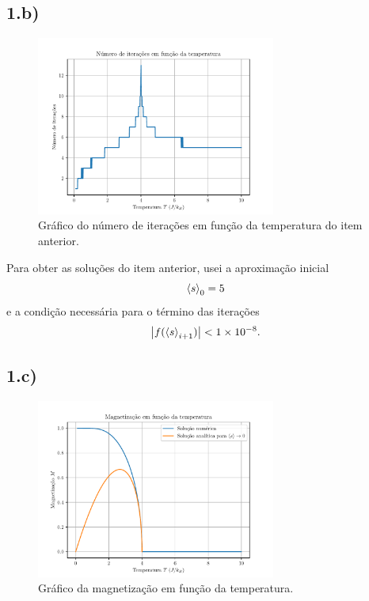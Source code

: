 \documentclass[a4paper, brazil]{article}
\begin{document}
\newpage
\subsection*{1.b)}

    \begin{figure}[ht]
        \centering
        \includegraphics[width=0.7\textwidth]{fig_1b.pdf}
        \caption{Gráfico do número de iterações em função da temperatura do item anterior.}\label{fig1b}
    \end{figure}

    Para obter as soluções do item anterior, usei a aproximação inicial
    \begin{equation}
        \expval{s}_0 = 5
    \end{equation}
    e a condição necessária para o término das iterações
    \begin{equation}
        \abs{f( \expval{s}_{i + 1} )} < \num{1e-8} .
    \end{equation}

\newpage
\subsection*{1.c)}

    \begin{figure}[ht]
        \centering
        \includegraphics[width=0.7\textwidth]{fig_1c.pdf}
        \caption{Gráfico da magnetização em função da temperatura.}\label{fig1c}
    \end{figure}
    
\end{document}
